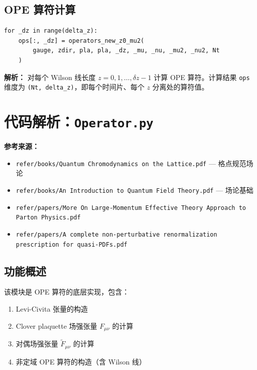 \documentclass[12pt,a4paper]{ctexart}
\begin{document}
\subsection{OPE 算符计算}

\begin{lstlisting}[caption={对所有 z 计算 OPE 算符}]
for _dz in range(delta_z):
    ops[:, _dz] = operators_new_z0_mu2(
        gauge, zdir, pla, pla, _dz, _mu, _nu, _mu2, _nu2, Nt
    )
\end{lstlisting}

\textbf{解析：}
对每个 Wilson 线长度 $z = 0, 1, \ldots, \delta z - 1$ 计算 OPE 算符。计算结果 \texttt{ops} 维度为 \texttt{(Nt, delta\_z)}，即每个时间片、每个 $z$ 分离处的算符值。

\section{代码解析：\texttt{Operator.py}}
\label{sec:operator}

\textbf{参考来源：}
\begin{itemize}
    \item \texttt{refer/books/Quantum Chromodynamics on the Lattice.pdf} — 格点规范场论
    \item \texttt{refer/books/An Introduction to Quantum Field Theory.pdf} — 场论基础
    \item \texttt{refer/papers/More On Large-Momentum Effective Theory Approach to Parton Physics.pdf}
    \item \texttt{refer/papers/A complete non-perturbative renormalization prescription for quasi-PDFs.pdf}
\end{itemize}

\subsection{功能概述}

该模块是 OPE 算符的底层实现，包含：
\begin{enumerate}
    \item Levi-Civita 张量的构造
    \item Clover plaquette 场强张量 $F_{\mu\nu}$ 的计算
    \item 对偶场强张量 $\tilde{F}_{\mu\nu}$ 的计算
    \item 非定域 OPE 算符的构造（含 Wilson 线）
\end{enumerate}
\end{document}
